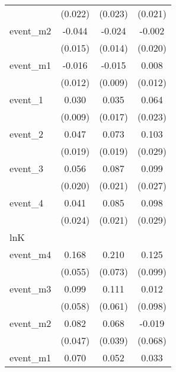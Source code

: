 \begin{table}[htbp]
\begin{tabular}{l*{3}{c}}
            &     (0.022)         &     (0.023)         &     (0.021)         \\
[1em]
event\_m2    &      -0.044\sym{**} &      -0.024         &      -0.002         \\
            &     (0.015)         &     (0.014)         &     (0.020)         \\
[1em]
event\_m1    &      -0.016         &      -0.015         &       0.008         \\
            &     (0.012)         &     (0.009)         &     (0.012)         \\
[1em]
event\_1     &       0.030\sym{**} &       0.035\sym{*}  &       0.064\sym{**} \\
            &     (0.009)         &     (0.017)         &     (0.023)         \\
[1em]
event\_2     &       0.047\sym{*}  &       0.073\sym{***}&       0.103\sym{***}\\
            &     (0.019)         &     (0.019)         &     (0.029)         \\
[1em]
event\_3     &       0.056\sym{**} &       0.087\sym{***}&       0.099\sym{***}\\
            &     (0.020)         &     (0.021)         &     (0.027)         \\
[1em]
event\_4     &       0.041         &       0.085\sym{***}&       0.098\sym{***}\\
            &     (0.024)         &     (0.021)         &     (0.029)         \\
\hline
lnK         &                     &                     &                     \\
event\_m4    &       0.168\sym{**} &       0.210\sym{**} &       0.125         \\
            &     (0.055)         &     (0.073)         &     (0.099)         \\
[1em]
event\_m3    &       0.099         &       0.111         &       0.012         \\
            &     (0.058)         &     (0.061)         &     (0.098)         \\
[1em]
event\_m2    &       0.082         &       0.068         &      -0.019         \\
            &     (0.047)         &     (0.039)         &     (0.068)         \\
[1em]
event\_m1    &       0.070\sym{*}  &       0.052         &       0.033         \\

\end{tabular}
\end{table}
